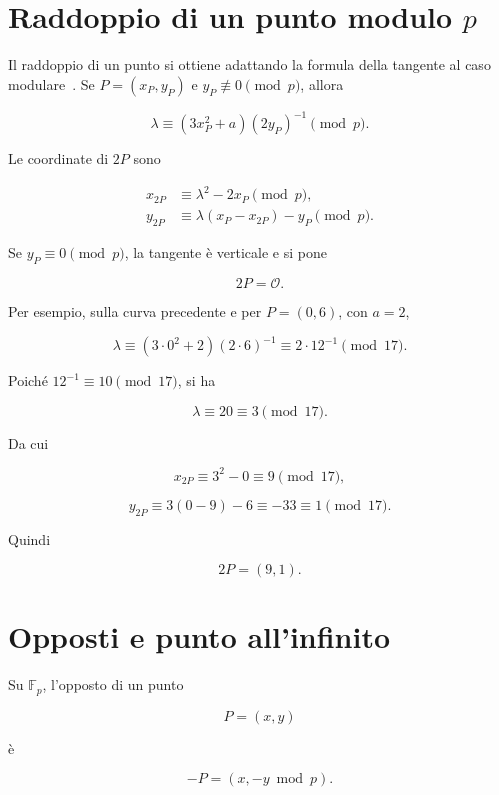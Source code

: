 \documentclass[12pt,a4paper,oneside]{report}
\begin{document}
\section{Raddoppio di un punto modulo \texorpdfstring{\(p\)}{p}}

Il raddoppio di un punto si ottiene adattando la formula della tangente al caso modulare~\cite{margara_ec,sec1}. Se \(P=(x_P,y_P)\) e \(y_P\not\equiv 0\pmod p\), allora

\begin{equation}
    \lambda \equiv (3x_P^2+a)(2y_P)^{-1}\pmod p.
    \label{eq:lambda-double-fp}
\end{equation}

Le coordinate di \(2P\) sono

\begin{align}
    x_{2P} &\equiv \lambda^2-2x_P \pmod p, \label{eq:double-x-fp}\\
    y_{2P} &\equiv \lambda(x_P-x_{2P})-y_P \pmod p. \label{eq:double-y-fp}
\end{align}

Se \(y_P\equiv 0\pmod p\), la tangente è verticale e si pone

\[
2P=\mathcal{O}.
\]

Per esempio, sulla curva precedente e per \(P=(0,6)\), con \(a=2\),

\[
\lambda \equiv (3\cdot 0^2+2)(2\cdot 6)^{-1}\equiv 2\cdot 12^{-1}\pmod{17}.
\]

Poiché \(12^{-1}\equiv 10\pmod{17}\), si ha

\[
\lambda\equiv 20\equiv 3\pmod{17}.
\]

Da cui

\[
x_{2P}\equiv 3^2-0\equiv 9\pmod{17},
\]

\[
y_{2P}\equiv 3(0-9)-6\equiv -33\equiv 1\pmod{17}.
\]

Quindi

\[
2P=(9,1).
\]

\section{Opposti e punto all'infinito}

Su \(\mathbb{F}_p\), l'opposto di un punto

\[
P=(x,y)
\]

è

\begin{equation}
    -P=(x,-y\bmod p).
\end{equation}
\end{document}

